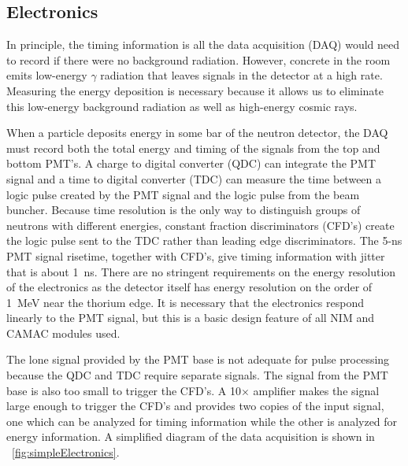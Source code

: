 \subsection{Electronics}
\label{sec:electronics}

In principle, the timing information is all the data acquisition (DAQ) would need to record if there were no background radiation.  However, concrete in the room emits low-energy $\gamma$ radiation that leaves signals in the detector at a high rate.  Measuring the energy deposition is necessary because it allows us to eliminate this low-energy background radiation as well as high-energy cosmic rays.

When a particle deposits energy in some bar of the neutron detector, the DAQ must record both the total energy and timing of the signals from the top and bottom PMT's.  A charge to digital converter (QDC) can integrate the PMT signal and a time to digital converter (TDC) can measure the time between a logic pulse created by the PMT signal and the logic pulse from the beam buncher.  Because time resolution is the only way to distinguish groups of neutrons with different energies, constant fraction discriminators (CFD's) create the logic pulse sent to the TDC rather than leading edge discriminators.  The 5-ns PMT signal risetime, together with CFD's, give timing information with jitter that is about 1~ns.  There are no stringent requirements on the energy resolution of the electronics as the detector itself has energy resolution on the order of 1~MeV near the thorium edge.  It is necessary that the electronics respond linearly to the PMT signal, but this is a basic design feature of all NIM and CAMAC modules used.

The lone signal provided by the PMT base is not adequate for pulse processing because the QDC and TDC require separate signals.  The signal from the PMT base is also too small to trigger the CFD's.  A 10$\times$ amplifier makes the signal large enough to trigger the CFD's and provides two copies of the input signal, one which can be analyzed for timing information while the other is analyzed for energy information.  A simplified diagram of the data acquisition is shown in {\fig}~\ref{fig:simpleElectronics}.

